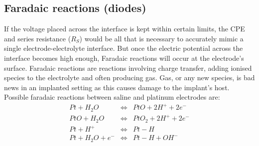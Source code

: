 

  \subsection{Faradaic reactions (diodes)}


    If the voltage placed across the interface is kept within certain limits, the CPE and series resistance ($R_{S}$) would be all that is necessary to accurately mimic a single electrode-electrolyte interface.
    But once the electric potential across the interface becomes high enough, Faradaic reactions will occur at the electrode's surface.
    Faradaic reactions are reactions involving charge transfer, adding ionised species to the electrolyte and often producing gas.
    Gas, or any new species, is bad news in an implanted setting as this causes damage to the implant's host.
    Possible faradaic reactions between saline and platinum electrodes are:
    \begin{eqnarray}
        Pt + H_{2}O &\Leftrightarrow& PtO + 2 H^{+} + 2 e^{-}\\
        PtO + H_{2}O &\Leftrightarrow& PtO_{2} + 2 H^{+} + 2e^{-}\\
        Pt + H^{+} & \Leftrightarrow & Pt-H\\
        Pt + H_{2}O + e^{-} &\Leftrightarrow& Pt-H+OH^{-}
    \end{eqnarray}

